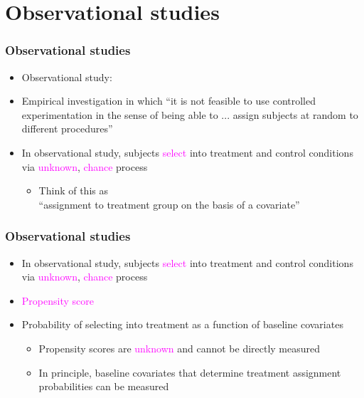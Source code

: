 \documentclass[table, xcolor = {dvipsnames}, 9pt]{beamer}
\theoremstyle{plain}
\begin{document}
\section{Observational studies}
\begin{frame}[t]
\frametitle{Observational studies}
\vfill
\begin{itemize} \vfill
\item Observational study: \vfill
\item[] Empirical investigation in which ``it is not feasible to use controlled experimentation in the sense of being able to ... assign subjects at random to different procedures'' \citep{cochran1965} \vfill
\item In observational study, subjects \textcolor{magenta}{select} into treatment and control conditions via \textcolor{magenta}{unknown}, \textcolor{magenta}{chance} process \vfill
\begin{itemize} \vfill
\item Think of this as \\ ``assignment to treatment group on the basis of a covariate'' \citep{rubin1977} \vfill
\end{itemize} \vfill
\end{itemize}
\vfill
\end{frame}
\begin{frame}[t]
\frametitle{Observational studies}
\vfill
\begin{itemize} \vfill
\item In observational study, subjects \textcolor{magenta}{select} into treatment and control conditions via \textcolor{magenta}{unknown}, \textcolor{magenta}{chance} process \vfill
\item \textcolor{magenta}{Propensity score} \vfill
\item[] Probability of selecting into treatment as a function of baseline covariates \vfill
\begin{itemize} \vfill
\item Propensity scores are \textcolor{magenta}{unknown} and cannot be directly measured \vfill
\item In principle, baseline covariates that determine treatment assignment probabilities can be measured \vfill
\end{itemize} \vfill
\end{itemize} \vfill
\end{frame}
\end{document}
